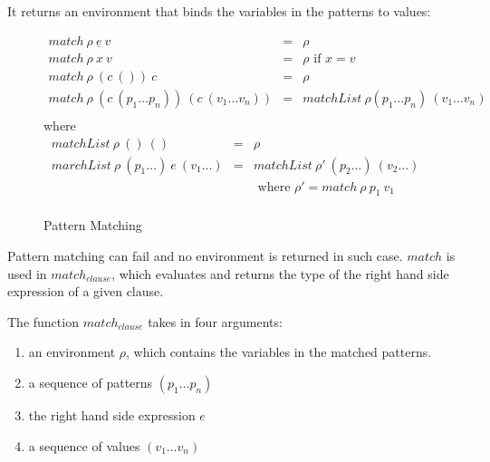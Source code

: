 \documentclass[acmsmall]{acmart}
\begin{document}
It returns an environment that binds the variables in the
patterns to values:

\begin{figure}[H]
  \begin{equation*}
    \begin{aligned}
      match \: \rho \: \underline{e} \: v                               & = & \rho                                                 \\
      match \: \rho \: x \: v                                           & = & \rho \textrm{ if } x = v                             \\
      match \: \rho \: (c \: ()) \: c                                   & = & \rho                                                 \\
      match \: \rho \: (c \: (p_1 \dots p_n)) \: (c \: (v_1 \dots v_n)) & = & matchList \: \rho (p_1 \dots p_n) \: (v_1 \dots v_n) \\
    \end{aligned}
  \end{equation*}
  \textrm{ where }
  \begin{equation*}
    \begin{aligned}
      matchList \: \rho \: () \: ()                        & = & \rho                                                                               \\
      marchList \: \rho \: (p_1 \dots) \: e \: (v_1 \dots) & = & matchList \: \rho' \:(p_2 \dots) \: (v_2 \dots)                                    \\
                                                           &   & \textrm{ where } \rho'                               = match \: \rho \: p_1 \: v_1 \\     
    \end{aligned}
  \end{equation*}
  \caption{Pattern Matching}
\end{figure}

Pattern matching can fail and no environment is returned in such case. $match$ is used in $match_{clause}$, which evaluates and returns the type of the right hand side expression of a given clause.

The function $match_{clause}$ takes in four arguments:

\begin{enumerate}
  \item an environment $\rho$, which contains the variables in the matched patterns.
  \item a sequence of patterns $(p_1 \dots p_n)$
  \item the right hand side expression $e$
  \item a sequence of values $(v_1 \dots v_n)$
\end{enumerate}
\end{document}
